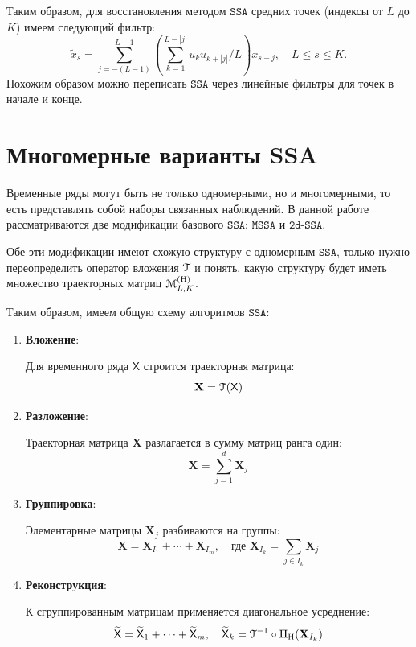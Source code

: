 \documentclass[12pt, specialist, subf
]{disser}
\theoremstyle{definition}
\newcommand{\SSA}{\texttt{SSA}}
\newcommand{\MSSA}{\texttt{MSSA}}
\newcommand{\DSSA}{\texttt{2d-SSA}}
\newcommand{\TS}{\mathsf{X}}
\newcommand{\MH}{\EuScript{M}_{L,K}^{(\mathrm{H})}}
\newcommand{\EMB}{\EuScript{T}}
\newcommand{\PH}{\Pi_{\mathrm{H}}}
\begin{document}
Таким образом, для восстановления методом $\SSA$ средних точек (индексы от $L$ до $K$) имеем следующий фильтр:
\begin{equation}
	\label{eq:representation_ssa_as_filter}
	{\widetilde{x}}_{s} = \sum_{j=-(L-1)}^{L-1} \left( \sum_{k=1}^{L-|j|} u_{k} u_{k+|j|} / L \right) x_{s-j}, \quad L \leq s \leq K.
\end{equation}
Похожим образом можно переписать $\SSA$ через линейные фильтры для точек в начале и конце.

\section{Многомерные варианты SSA}

Временные ряды могут быть не только одномерными, но и многомерными, то есть представлять собой наборы связанных наблюдений.  В данной работе рассматриваются две модификации базового $\SSA$:
 $\MSSA$ и $\DSSA$.

Обе эти модификации имеют схожую структуру с одномерным $\SSA$, только нужно переопределить оператор вложения $\EMB$ и понять, какую структуру будет иметь множество траекторных матриц $\MH$.

Таким образом, имеем общую схему алгоритмов $\SSA$:

\begin{enumerate}
    \item \textbf{Вложение}:
    
    Для временного ряда $\TS$ строится траекторная матрица:
    \[
    \mathbf{X} = \EMB(\TS)
    \]
    
    \item \textbf{Разложение}:
    
    Траекторная матрица $\mathbf{X}$ разлагается в сумму матриц ранга один:
    \[
    \mathbf{X} = \sum_{j=1}^d \mathbf{X}_j
    \]
    
    \item \textbf{Группировка}:
    
    Элементарные матрицы $\mathbf{X}_j$ разбиваются на группы:
    \[
    \mathbf{X} = \mathbf{X}_{I_1} + \cdots + \mathbf{X}_{I_m}, \quad \text{где } \mathbf{X}_{I_k} = \sum_{j \in I_k} \mathbf{X}_j
    \]
    
    \item \textbf{Реконструкция}:
    
    К сгруппированным матрицам применяется диагональное усреднение:
    \[
    \widetilde{\TS} = \widetilde{\TS}_1 + \cdots + \widetilde{\TS}_m, \quad
    \widetilde{\TS}_k =\EMB^{-1} \circ \PH (\mathbf{X}_{I_k})
    \]
\end{enumerate}
\end{document}
